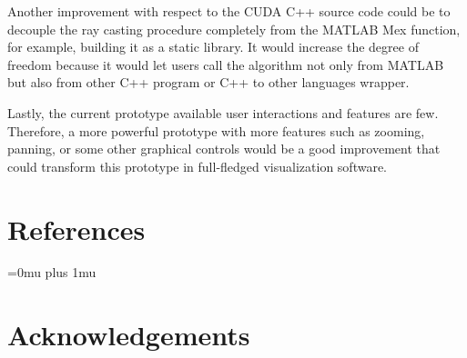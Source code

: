 \documentclass[12pt,a4paper]{extarticle}
\newcommand{\linespace}{\vspace{0pt}}
\begin{document}
Another improvement with respect to the CUDA C++ source code could be to decouple the ray casting procedure completely from the MATLAB Mex function, for example, building it as a static library. It would increase the degree of freedom because it would let users call the algorithm not only from MATLAB but also from other C++ program or C++ to other languages wrapper.
\linespace

Lastly, the current prototype available user interactions and features are few. Therefore, a more powerful prototype with more features such as zooming, panning, or some other graphical controls would be a good improvement that could transform this prototype in full-fledged visualization software.
\pagebreak
\section*{References}
\Urlmuskip=0mu plus 1mu\relax
\printbibliography[heading=none]{}
\pagebreak
\section*{Acknowledgements}
\end{document}
